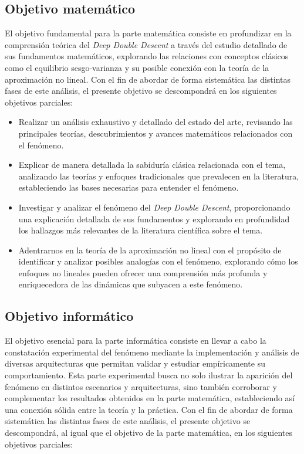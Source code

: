 \subsection{Objetivo matemático}

El objetivo fundamental para la parte matemática consiste en profundizar en la comprensión teórica del \textit{Deep Double Descent} a través del estudio detallado de sus fundamentos matemáticos, explorando las relaciones con conceptos clásicos como el equilibrio sesgo-varianza y su posible conexión con la teoría de la aproximación no lineal. Con el fin de abordar de forma sistemática las distintas fases de este análisis, el presente objetivo se descompondrá en los siguientes objetivos parciales:

\begin{itemize}
    \item Realizar un análisis exhaustivo y detallado del estado del arte, revisando las principales teorías, descubrimientos y avances matemáticos relacionados con el fenómeno.
    \item Explicar de manera detallada la sabiduría clásica relacionada con el tema, analizando las teorías y enfoques tradicionales que prevalecen en la literatura, estableciendo las bases necesarias para entender el fenómeno.
    \item Investigar y analizar el fenómeno del \textit{Deep Double Descent}, proporcionando una explicación detallada de sus fundamentos y explorando en profundidad los hallazgos más relevantes de la literatura científica sobre el tema.
    \item Adentrarnos en la teoría de la aproximación no lineal con el propósito de identificar y analizar posibles analogías con el fenómeno, explorando cómo los enfoques no lineales pueden ofrecer una comprensión más profunda y enriquecedora de las dinámicas que subyacen a este fenómeno.\newline
\end{itemize}

\subsection{Objetivo informático}

El objetivo esencial para la parte informática consiste en llevar a cabo la constatación experimental del fenómeno mediante la implementación y análisis de diversas arquitecturas que permitan validar y estudiar empíricamente su comportamiento. Esta parte experimental busca no solo ilustrar la aparición del fenómeno en distintos escenarios y arquitecturas, sino también corroborar y complementar los resultados obtenidos en la parte matemática, estableciendo así una conexión sólida entre la teoría y la práctica. Con el fin de abordar de forma sistemática las distintas fases de este análisis, el presente objetivo se descompondrá, al igual que el objetivo de la parte matemática, en los siguientes objetivos parciales:

